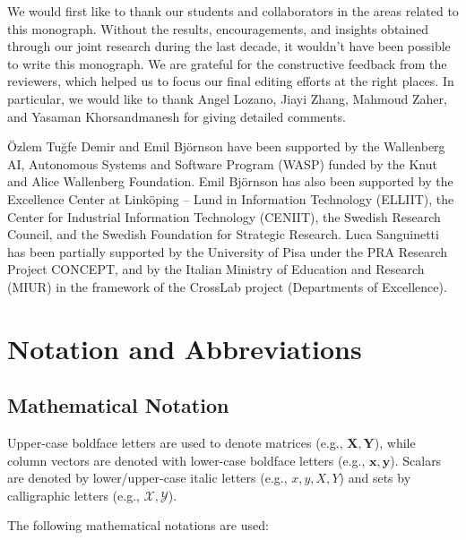 \documentclass[SIG,biber]{nowfnt}
\newcommand{\vect}[1]{\mathbf{#1}}
\begin{document}
\begin{acknowledgements}

We would first like to thank our students and collaborators in the areas related to this monograph. Without the results, encouragements, and insights obtained through our joint research during the last decade, it wouldn't have been possible to write this monograph.
We are grateful for the constructive feedback from the reviewers, which helped us to focus our final editing efforts at the right places. In particular, we would like to thank Angel Lozano, Jiayi Zhang, Mahmoud Zaher, and Yasaman Khorsandmanesh for giving detailed comments.

\"{O}zlem Tu\u{g}fe Demir and Emil Bj\"ornson have been supported by the Wallenberg AI, Autonomous Systems and Software Program (WASP) funded by the Knut and Alice Wallenberg Foundation. Emil Bj\"ornson has also been supported by the Excellence Center at Link\"oping -- Lund in Information Technology (ELLIIT), the Center for Industrial Information Technology (CENIIT), the Swedish Research Council, and the Swedish Foundation for Strategic Research. Luca Sanguinetti has been partially supported by the University of Pisa under the PRA Research Project CONCEPT, and by the Italian Ministry of Education and Research (MIUR) in the framework of the CrossLab project (Departments of Excellence).

\end{acknowledgements}


\appendix



\chapter{Notation and Abbreviations}


\section*{Mathematical Notation}

Upper-case boldface letters are used to denote matrices (e.g., $\vect{X},\vect{Y}$), while column vectors are denoted with lower-case boldface letters (e.g., $\vect{x},\vect{y}$). Scalars are denoted by lower/upper-case italic letters (e.g., $x,y,X,Y$) and sets by calligraphic letters (e.g., $\mathcal{X},\mathcal{Y}$). 

The following mathematical notations are used:
\end{document}
